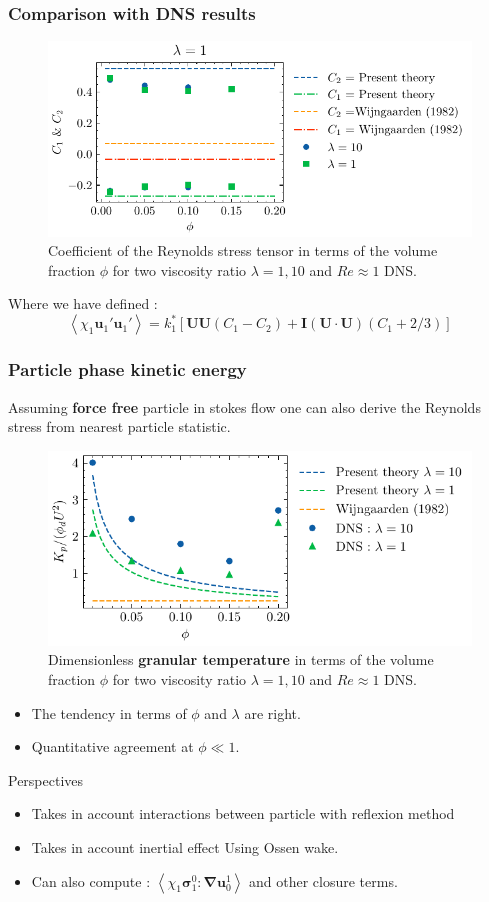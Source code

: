 \documentclass{sintefbeamer}
\newcommand{\avg}[1]{\left<#1\right>}
\newcommand{\grad}{\mathbf{\nabla}}
\begin{document}
\begin{frame}
  \frametitle{Comparison with DNS results }
  \begin{figure}[h!]
    \centering    
    \includegraphics[height = 0.25\textwidth]{image/HOMOGENEOUS/fCA/Pseudo_turbe_coef.pdf}
    \caption{
       Coefficient of the Reynolds stress tensor in terms of the volume fraction $\phi$ for two viscosity ratio $\lambda =1,10$ and $Re \approx 1$ DNS. 
    }
    \label{fig:Cp}
\end{figure}  
Where we have defined :
\begin{equation*}
  \avg{\chi_1\textbf{u}_1'\textbf{u}_1'}
  = k^*_1 \left[
      \textbf{U}
      \textbf{U}
      (C_1  - C_2 )
      + \textbf{I} 
      (\textbf{U}\cdot\textbf{U})  (C_1+2/3) 
  \right]
\end{equation*}
\end{frame}


\begin{frame}
  \frametitle{Particle phase kinetic energy}
  Assuming \textbf{force free} particle in stokes flow one can also derive the Reynolds stress from nearest particle statistic. 
  \begin{figure}[h!]
    \centering    
    \includegraphics[height = 0.25\textwidth]{image/HOMOGENEOUS/fCA/Pseudo_turbeP.pdf}
    \caption{
       Dimensionless \textbf{granular temperature} in terms of the volume fraction $\phi$ for two viscosity ratio $\lambda =1,10$ and $Re \approx 1$ DNS. 
    }
    \label{fig:Cp}
\end{figure}  
\begin{itemize}
  \item The tendency in terms of $\phi$ and $\lambda$ are right.  
  \item Quantitative agreement at $\phi \ll 1$.  
\end{itemize}


\end{frame}
\begin{frame}
  {Perspectives}
  \begin{itemize}
    \item Takes in account interactions between particle with reflexion method 
    \item Takes in account inertial effect Using Ossen wake. 
    \item Can also compute : $\avg{\chi_1 \bm{\sigma}_1^0 : \grad  \textbf{u}_0^1}$ and other closure terms. 
  \end{itemize}
\end{frame}
\end{document}
